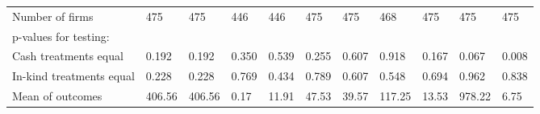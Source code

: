 \begin{table}[H]
{\begin{tabular}{lllllllllll}
\hspace{1em}Number of firms & 475 & 475 & 446 & 446 & 475 & 475 & 468 & 475 & 475 & 475\\
\hspace{1em}p-values for testing: &  &  &  &  &  &  &  &  &  & \\
\hspace{1em}\hspace{1em} Cash treatments equal & 0.192 & 0.192 & 0.350 & 0.539 & 0.255 & 0.607 & 0.918 & 0.167 & 0.067 & 0.008\\
\hspace{1em}\hspace{1em} In-kind treatments equal & 0.228 & 0.228 & 0.769 & 0.434 & 0.789 & 0.607 & 0.548 & 0.694 & 0.962 & 0.838\\
\hspace{1em}Mean of outcomes & 406.56 & 406.56 & 0.17 & 11.91 & 47.53 & 39.57 & 117.25 & 13.53 & 978.22 & 6.75\\
\bottomrule
\end{tabular}}
\end{table}
